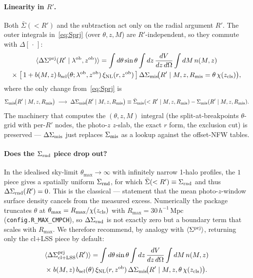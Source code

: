 \documentclass[a4paper, 11pt]{article}
\newcommand{\lob}{\lambda^{\rm ob}}
\newcommand{\zob}{z^{\rm ob}}
\newcommand{\zcls}{z_{\rm cls}}
\newcommand{\xinl}{\xi_{\rm NL}}
\newcommand{\hMpc}{h^{-1}\,\mathrm{Mpc}}
\newcommand{\bsel}{b_{\rm sel}}
\newcommand{\Sprj}{\Sigma^{\rm prj}}
\newcommand{\Smis}{\Sigma_{\rm mis}}
\newcommand{\DSmis}{\Delta\Sigma_{\rm mis}}
\newcommand{\DSprj}{\Delta\Sigma^{\rm prj}}
\newcommand{\avg}[1]{\langle #1 \rangle}
\newcommand{\Rmis}{R_{\rm mis}}
\newcommand{\dO}{d\Omega}
\begin{document}
\paragraph{Linearity in \(R'\).}
Both \(\bar\Sigma(<R')\) and the subtraction act only on the
radial argument \(R'\). The outer integrals in~\eqref{eq:Sprj}
(over \(\theta, z, M\)) are \(R'\)-independent, so they commute
with \(\Delta[\,\cdot\,]\):
\begin{multline}
\avg{\DSprj(R'\mid\lob,\zob)} =
\int d\theta\sin\theta\int dz\,\frac{dV}{dz\,\dO}\int dM\,n(M,z)\\
\times\;\bigl[\,1 + b(M,z)\,\bsel(\theta;\lob,\zob)\,\xinl(r,\zob)\,\bigr]\,
\DSmis\!\bigl(R'\mid M,z,\Rmis=\theta\,\chi(\zcls)\bigr),
\label{eq:DSprj}
\end{multline}
where the only change from~\eqref{eq:Sprj} is
\begin{equation}
\Smis\!\bigl(R'\mid M,z,\Rmis\bigr)
\;\longrightarrow\;
\DSmis\!\bigl(R'\mid M,z,\Rmis\bigr)
\equiv \bar\Sigma_{\rm mis}(<R'\mid M,z,\Rmis) - \Smis(R'\mid M,z,\Rmis).
\label{eq:DSmis_def}
\end{equation}
The machinery that computes the \((\theta, z, M)\) integral (the
split-at-breakpoints \(\theta\)-grid with per-\(R'\) nodes, the
photo-\(z\) \(z\)-slab, the exact \(r\) form, the exclusion cut)
is preserved --- \(\DSmis\) just replaces \(\Smis\) as a lookup
against the offset-NFW tables.

\paragraph{Does the \(\Sigma_{\rm rnd}\) piece drop out?}
In the idealised sky-limit \(\theta_{\max}\!\to\!\infty\) with
infinitely narrow 1-halo profiles, the \(1\) piece gives a
spatially uniform \(\Sigma_{\rm rnd}\), for which
\(\bar\Sigma(<R')\equiv\Sigma_{\rm rnd}\) and thus
\(\Delta\Sigma_{\rm rnd}(R')=0\). This is the classical
\citet{Sheldon2009}--\citet{Zu2014}--\citet{Melchior2017}
statement that the mean photo-\(z\)-window surface density cancels
from the measured excess. Numerically the package truncates
\(\theta\) at \(\theta_{\max}=R_{\max}/\chi(\zcls)\) with
\(R_{\max}=30\,\hMpc\) (\texttt{config.R\_MAX\_CMPCH}), so
\(\Delta\Sigma_{\rm rnd}\) is not exactly zero but a boundary term
that scales with \(R_{\max}\). We therefore recommend, by analogy
with \(\avg{\Sprj}\), returning only the cl+LSS piece by default:
\begin{multline}
\avg{\DSprj_{\rm cl+LSS}(R')}
= \int d\theta\sin\theta\int dz\,\frac{dV}{dz\,\dO}\int dM\,n(M,z)\\
\times\; b(M,z)\,\bsel(\theta)\,\xinl(r,\zob)\,
\DSmis\!\bigl(R'\mid M,z,\theta\,\chi(\zcls)\bigr).
\label{eq:DSprj_cl}
\end{multline}
\end{document}
